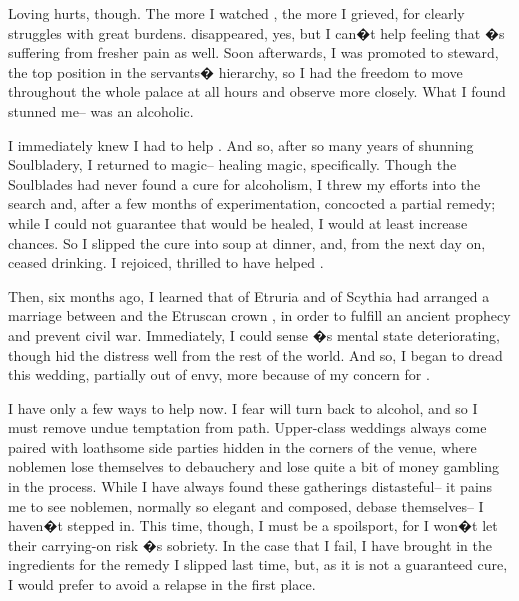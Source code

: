\documentclass[char]{Kos}
\begin{document}
Loving \cBride{\them} hurts, though. The more I watched \cBride{\them}, the more I grieved, for \cBride{\they} clearly struggles with great burdens. \cBride{\Their} \cFugitive{\sibling} disappeared, yes, but I can�t help feeling that \cBride{\nickname}�s suffering from fresher pain as well. Soon afterwards, I was promoted to steward, the top position in the servants� hierarchy, so I had the freedom to move throughout the whole palace at all hours and observe \cBride{\them} more closely. What I found stunned me-- \cBride{\they} was an alcoholic.

I immediately knew I had to help \cBride{\them}. And so, after so many years of shunning Soulbladery, I returned to magic-- healing magic, specifically. Though the Soulblades had never found a cure for alcoholism, I threw my efforts into the search and, after a few months of experimentation, concocted a partial remedy; while I could not guarantee that \cBride{\they} would be healed, I would at least increase \cBride{\their} chances. So I slipped the cure into \cBride{\their} soup at dinner, and, from the next day on, \cBride{\they} ceased drinking. I rejoiced, thrilled to have helped \cBride{\them}.

Then, six months ago, I learned that \cEtruriaKing{\Monarch} \cEtruriaKing{\nickname} of Etruria and \cScythiaKing{\Monarch} \cScythiaKing{\nickname} of Scythia had arranged a marriage between \cBride{\nickname} and the Etruscan crown \cGroom{\prince} \cGroom{\nickname}, in order to fulfill an ancient prophecy and prevent civil war. Immediately, I could sense \cBride{\nickname}�s mental state deteriorating, though \cBride{\they} hid the distress well from the rest of the world. And so, I began to dread this wedding, partially out of envy, more because of my concern for \cBride{\them}.

I have only a few ways to help \cBride{\them} now. I fear \cBride{\they} will turn back to alcohol, and so I must remove undue temptation from \cBride{\their} path. Upper-class weddings always come paired with loathsome side parties hidden in the corners of the venue, where noblemen lose themselves to debauchery and lose quite a bit of money gambling in the process. While I have always found these gatherings distasteful-- it pains me to see noblemen, normally so elegant and composed, debase themselves-- I haven�t stepped in. This time, though, I must be a spoilsport, for I won�t let their carrying-on risk \cBride{\nickname}�s sobriety. In the case that I fail, I have brought in the ingredients for the remedy I slipped \cBride{\them} last time, but, as it is not a guaranteed cure, I would prefer to avoid a relapse in the first place.
\end{document}
